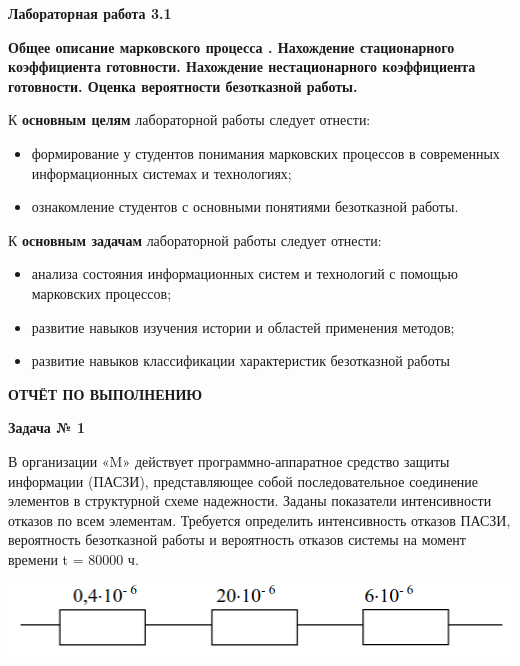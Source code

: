 
\graphicspath{ {3.1/models/} }
\usepackage{hyperref}
\usepackage{upgreek}

\pagestyle{fancy}
\fancyhead{}
\renewcommand{\headrulewidth}{0pt}


\begin{center}
    \textbf{Лабораторная работа 3.1}

    \textbf{Общее описание марковского процесса .
Нахождение стационарного коэффициента готовности. Нахождение
нестационарного коэффициента готовности. Оценка вероятности
безотказной работы.}
\end{center}

К \textbf{основным целям} лабораторной работы следует отнести:

\begin{itemize}
    \item формирование у студентов понимания марковских процессов в современных информационных системах и технологиях;
    \item ознакомление студентов с основными понятиями безотказной работы.
\end{itemize}

К \textbf{основным задачам} лабораторной работы следует отнести:

\begin{itemize}
    \item анализа состояния информационных систем и технологий с помощью марковских процессов;
    \item развитие навыков изучения истории и областей применения методов;
    \item развитие навыков классификации характеристик безотказной работы
\end{itemize}
\bigskip

\pagebreak

\begin{center}
\textbf{ОТЧЁТ ПО ВЫПОЛНЕНИЮ}
\end{center}

\textbf{Задача № 1}

В организации «M» действует программно-аппаратное средство
защиты информации (ПАСЗИ), представляющее собой последовательное
соединение элементов в структурной схеме надежности. Заданы
показатели интенсивности отказов по всем элементам. Требуется
определить интенсивность отказов ПАСЗИ, вероятность безотказной
работы и вероятность отказов системы на момент времени t = 80000 ч.
\bigskip

\noindent
\begin{minipage}[H]{\linewidth}
    \includegraphics[scale=0.7]{1}
\end{minipage}
\bigskip


